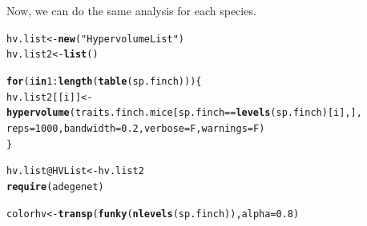 \documentclass[12pt]{article}\usepackage[]{graphicx}\usepackage[]{color}
\makeatletter
\newcommand{\hlnum}[1]{\textcolor[rgb]{0.686,0.059,0.569}{#1}}%
\newcommand{\hlstr}[1]{\textcolor[rgb]{0.192,0.494,0.8}{#1}}%
\newcommand{\hlopt}[1]{\textcolor[rgb]{0,0,0}{#1}}%
\newcommand{\hlstd}[1]{\textcolor[rgb]{0.345,0.345,0.345}{#1}}%
\newcommand{\hlkwa}[1]{\textcolor[rgb]{0.161,0.373,0.58}{\textbf{#1}}}%
\newcommand{\hlkwb}[1]{\textcolor[rgb]{0.69,0.353,0.396}{#1}}%
\newcommand{\hlkwc}[1]{\textcolor[rgb]{0.333,0.667,0.333}{#1}}%
\newcommand{\hlkwd}[1]{\textcolor[rgb]{0.737,0.353,0.396}{\textbf{#1}}}%
\newenvironment{kframe}{%
 \def\at@end@of@kframe{}%
 \ifinner\ifhmode%
  \def\at@end@of@kframe{\end{minipage}}%
  \begin{minipage}{\columnwidth}%
 \fi\fi%
 \def\FrameCommand##1{\hskip\@totalleftmargin \hskip-\fboxsep
 \colorbox{shadecolor}{##1}\hskip-\fboxsep
     \hskip-\linewidth \hskip-\@totalleftmargin \hskip\columnwidth}%
 \MakeFramed {\advance\hsize-\width
   \@totalleftmargin\z@ \linewidth\hsize
   \@setminipage}}%
 {\par\unskip\endMakeFramed%
 \at@end@of@kframe}
\newenvironment{knitrout}{}{} %
\makeatother
\begin{document}
Now, we can do the same analysis for each species.

\begin{knitrout}
\color{fgcolor}\begin{kframe}
\begin{alltt}
\hlstd{hv.list}\hlkwb{<-}\hlkwd{new}\hlstd{(}\hlstr{"HypervolumeList"}\hlstd{)}
\hlstd{hv.list2}\hlkwb{<-}\hlkwd{list}\hlstd{()}

\hlkwa{for}\hlstd{(i} \hlkwa{in} \hlnum{1}\hlopt{:} \hlkwd{length}\hlstd{(}\hlkwd{table}\hlstd{(sp.finch))) \{}
 \hlstd{hv.list2[[i]]}\hlkwb{<-}\hlkwd{hypervolume}\hlstd{(traits.finch.mice[sp.finch} \hlopt{==} \hlkwd{levels}\hlstd{(sp.finch)[i], ],}
        \hlkwc{reps} \hlstd{=} \hlnum{1000}\hlstd{,}\hlkwc{bandwidth} \hlstd{=} \hlnum{0.2}\hlstd{,} \hlkwc{verbose} \hlstd{= F,} \hlkwc{warnings} \hlstd{= F)}
\hlstd{\}}

\hlstd{hv.list}\hlopt{@}\hlkwc{HVList}\hlkwb{<-}\hlstd{hv.list2}
\hlkwd{require}\hlstd{(adegenet)}
\end{alltt}


{\ttfamily\noindent\itshape\color{messagecolor}{\#\# Loading required package: adegenet\\\#\#\ \ \ \ ==========================\\\#\#\ \ \ \  adegenet 1.4-2 is loaded\\\#\#\ \ \ \ ==========================\\\#\# \\\#\#\ \ - to start, type '?adegenet'\\\#\#\ \ - to browse adegenet website, type 'adegenetWeb()'\\\#\#\ \ - to post questions/comments: adegenet-forum@lists.r-forge.r-project.org}}\begin{alltt}
\hlstd{colorhv}\hlkwb{<-}\hlkwd{transp}\hlstd{(}\hlkwd{funky}\hlstd{(}\hlkwd{nlevels}\hlstd{(sp.finch)),} \hlkwc{alpha} \hlstd{=} \hlnum{0.8}\hlstd{)}


\end{alltt}
\end{kframe}
\end{knitrout}
\end{document}
